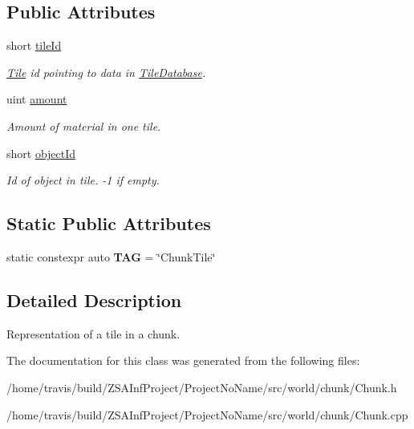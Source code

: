 \subsection*{Public Attributes}
\begin{DoxyCompactItemize}
\item 
\hypertarget{classChunkTile_ac7277fa1d196411449a646d3eed73b39}{short \hyperlink{classChunkTile_ac7277fa1d196411449a646d3eed73b39}{tile\-Id}}\label{classChunkTile_ac7277fa1d196411449a646d3eed73b39}

\begin{DoxyCompactList}\small\item\em \hyperlink{classTile}{Tile} id pointing to data in \hyperlink{classTileDatabase}{Tile\-Database}. \end{DoxyCompactList}\item 
\hypertarget{classChunkTile_a29ac3a16c7075941a5c483f1a3372364}{uint \hyperlink{classChunkTile_a29ac3a16c7075941a5c483f1a3372364}{amount}}\label{classChunkTile_a29ac3a16c7075941a5c483f1a3372364}

\begin{DoxyCompactList}\small\item\em Amount of material in one tile. \end{DoxyCompactList}\item 
\hypertarget{classChunkTile_af7c87e439222b62f7dbf791804c52381}{short \hyperlink{classChunkTile_af7c87e439222b62f7dbf791804c52381}{object\-Id}}\label{classChunkTile_af7c87e439222b62f7dbf791804c52381}

\begin{DoxyCompactList}\small\item\em Id of object in tile. -\/1 if empty. \end{DoxyCompactList}\end{DoxyCompactItemize}
\subsection*{Static Public Attributes}
\begin{DoxyCompactItemize}
\item 
\hypertarget{classChunkTile_a321f107b80df537c1d2abbe36bf13df1}{static constexpr auto {\bfseries T\-A\-G} = \char`\"{}Chunk\-Tile\char`\"{}}\label{classChunkTile_a321f107b80df537c1d2abbe36bf13df1}

\end{DoxyCompactItemize}


\subsection{Detailed Description}
Representation of a tile in a chunk. 

The documentation for this class was generated from the following files\-:\begin{DoxyCompactItemize}
\item 
/home/travis/build/\-Z\-S\-A\-Inf\-Project/\-Project\-No\-Name/src/world/chunk/Chunk.\-h\item 
/home/travis/build/\-Z\-S\-A\-Inf\-Project/\-Project\-No\-Name/src/world/chunk/Chunk.\-cpp\end{DoxyCompactItemize}
